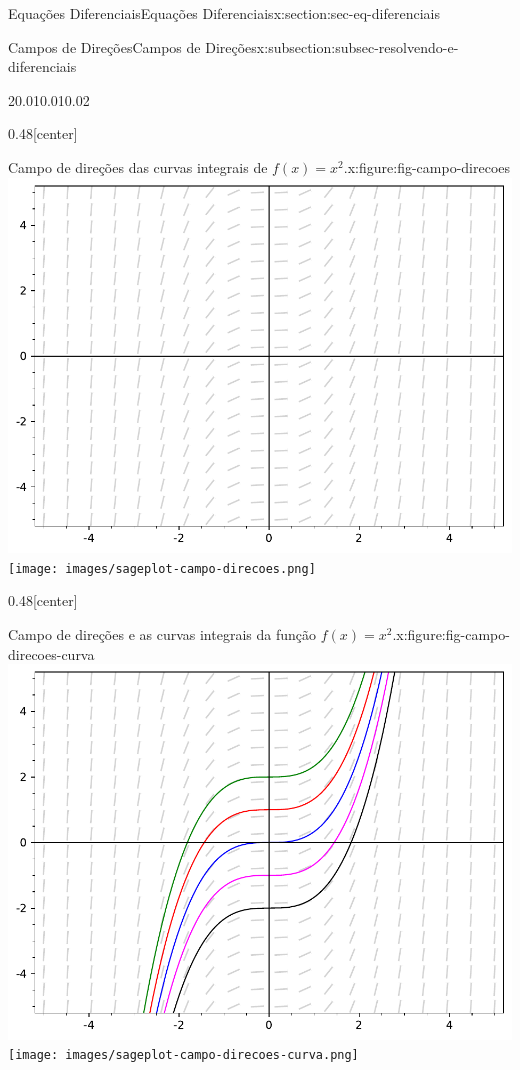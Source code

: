 \documentclass[oneside,10pt,]{article}
\numberwithin{equation}{section}
\begin{document}
\begin{sectionptx}{Equações Diferenciais}{}{Equações Diferenciais}{}{}{x:section:sec-eq-diferenciais}
\begin{subsectionptx}{Campos de Direções}{}{Campos de Direções}{}{}{x:subsection:subsec-resolvendo-e-diferenciais}
\begin{sidebyside}{2}{0.01}{0.01}{0.02}
\begin{sbspanel}{0.48}[center]
\begin{figureptx}{Campo de direções das curvas integrais de \(f(x)=x^2\).}{x:figure:fig-campo-direcoes}{}
{\includegraphics[width=\linewidth]{images/sageplot-campo-direcoes.pdf}}%
{\texttt{[image: images/sageplot-campo-direcoes.png]}}
\tcblower
\end{figureptx}%
\end{sbspanel}%
\begin{sbspanel}{0.48}[center]%
\begin{figureptx}{Campo de direções e as curvas integrais da função \(f(x)=x^2\).}{x:figure:fig-campo-direcoes-curva}{}%
%
{\includegraphics[width=\linewidth]{images/sageplot-campo-direcoes-curva.pdf}}%
{\texttt{[image: images/sageplot-campo-direcoes-curva.png]}}
\tcblower
\end{figureptx}%

\end{sbspanel}
\end{sidebyside}
\end{subsectionptx}
\end{sectionptx}
\end{document}
